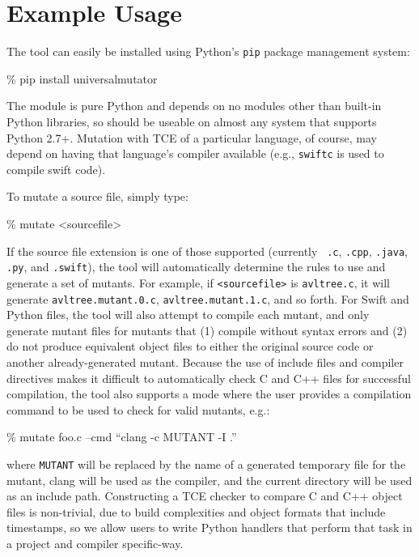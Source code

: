 \section{Example Usage}

The tool can easily be installed using Python's {\tt pip} package management system:

\begin{code}
\% pip install universalmutator
\end{code}

The module is pure Python and depends on no modules other than
built-in Python libraries, so should be useable on almost any system
that supports Python 2.7+.  Mutation with TCE of a particular
language, of course, may depend on having that language's compiler
available (e.g., {\tt swiftc} is used to compile swift code).

To mutate a source file, simply type:


\begin{code}
\% mutate <sourcefile>
\end{code}

If the source file extension is one of those supported (currently {\tt
  .c}, {\tt .cpp}, {\tt .java}, {\tt .py}, and {\tt .swift}), the tool
will automatically determine the rules to use and generate a set of
mutants.  For example, if {\tt <sourcefile>} is {\tt avltree.c}, it
will generate {\tt avltree.mutant.0.c}, {\tt avltree.mutant.1.c}, and
so forth.  For Swift and Python files, the tool will also attempt to
compile each mutant, and only generate mutant files for mutants that
(1) compile without syntax errors and (2) do not produce equivalent
object files to either the original source code or another
already-generated mutant.  Because the use of include files and
compiler directives makes it difficult to automatically check C and
C++ files
for successful compilation, the tool also supports a mode where the
user provides a compilation command to be used to check for valid
mutants, e.g.:


\begin{code}
\% mutate foo.c --cmd ``clang -c MUTANT -I .''
\end{code}

\noindent where {\tt MUTANT} will be replaced by the name of a
generated temporary file for the mutant, clang will be used as the
compiler, and the current directory will be used as an include path.  Constructing a TCE checker
to compare C and C++ object files is non-trivial, due to build
complexities and object formats that include timestamps, so we allow
users to write Python handlers that perform that task in a project and
compiler specific-way.

